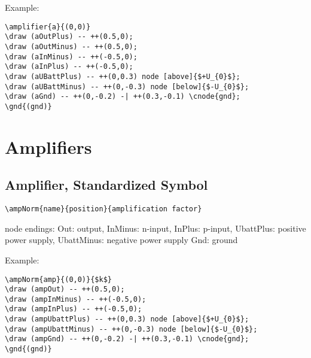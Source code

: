 \documentclass[parskip=full]{scrartcl}
\begin{document}
Example:\\
\begin{minipage}{0.8\textwidth}
\begin{verbatim}
\amplifier{a}{(0,0)}
\draw (aOutPlus) -- ++(0.5,0);
\draw (aOutMinus) -- ++(0.5,0);
\draw (aInMinus) -- ++(-0.5,0);
\draw (aInPlus) -- ++(-0.5,0);
\draw (aUBattPlus) -- ++(0,0.3) node [above]{$+U_{0}$};
\draw (aUBattMinus) -- ++(0,-0.3) node [below]{$-U_{0}$};
\draw (aGnd) -- ++(0,-0.2) -| ++(0.3,-0.1) \cnode{gnd};
\gnd{(gnd)}
\end{verbatim}
\end{minipage}
\begin{minipage}{0.19\textwidth}
\end{minipage}

\section{Amplifiers}

\subsection{Amplifier, Standardized Symbol}

\begin{verbatim}
\ampNorm{name}{position}{amplification factor}
\end{verbatim}
node endings: Out: output, InMinus: n-input, InPlus: p-input,
              UbattPlus: positive power supply,
              UbattMinus: negative power supply
              Gnd: ground

Example:\\
\begin{minipage}{0.8\textwidth}
\begin{verbatim}
\ampNorm{amp}{(0,0)}{$k$}
\draw (ampOut) -- ++(0.5,0);
\draw (ampInMinus) -- ++(-0.5,0);
\draw (ampInPlus) -- ++(-0.5,0);
\draw (ampUbattPlus) -- ++(0,0.3) node [above]{$+U_{0}$};
\draw (ampUbattMinus) -- ++(0,-0.3) node [below]{$-U_{0}$};
\draw (ampGnd) -- ++(0,-0.2) -| ++(0.3,-0.1) \cnode{gnd};
\gnd{(gnd)}
\end{verbatim}
\end{minipage}
\begin{minipage}{0.19\textwidth}
\end{minipage}
\end{document}
